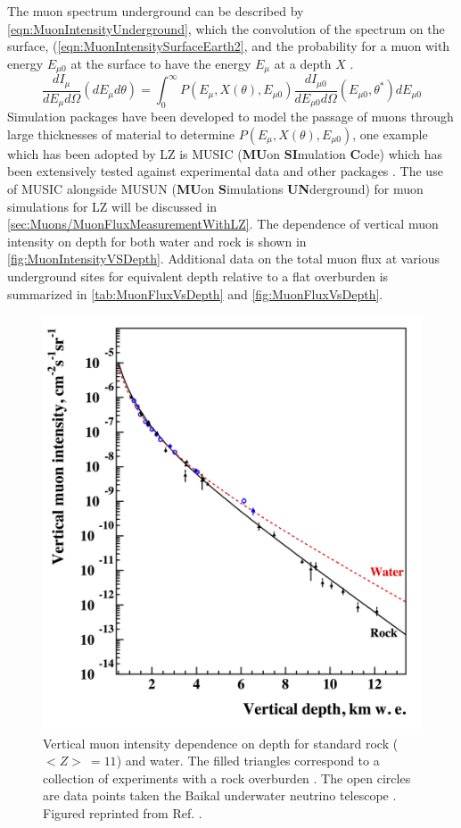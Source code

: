 The muon spectrum underground can be described by \autoref{eqn:MuonIntensityUnderground}, which the convolution of the spectrum on the surface, (\autoref{eqn:MuonIntensitySurfaceEarth2}, and the probability for a muon with energy $E_{\mu 0}$ at the surface to have the energy $E_\mu$ at a depth $X$ \cite{musun}.
\begin{equation}\label{eqn:MuonIntensityUnderground}
    \frac{dI_\mu}{dE_\mu d\Omega}(dE_\mu d\theta)=\int^\infty_0P(E_\mu,X(\theta),E_{\mu0})\frac{dI_{\mu0}}{dE_{\mu0}d\Omega}(E_{\mu0},\theta^*)dE_{\mu 0}
\end{equation}
Simulation packages have been developed to model the passage of muons through large thicknesses of material to determine $P(E_\mu,X(\theta),E_{\mu0})$, one example which has been adopted by LZ is MUSIC (\textbf{MU}on \textbf{SI}mulation \textbf{C}ode) which has been extensively tested against experimental data and other packages \cite{musun,LVD:1998lir,PhysRevD.60.112001,Tang:2006uu,MACRO:2003qix}. The use of MUSIC alongside MUSUN (\textbf{MU}on \textbf{S}imulations \textbf{UN}derground) for muon simulations for LZ will be discussed in \autoref{sec:Muons/MuonFluxMeasurementWithLZ}.
The dependence of vertical muon intensity on depth for both water and rock is shown in \autoref{fig:MuonIntensityVSDepth}. Additional data on the total muon flux at various underground sites for equivalent depth relative to a flat overburden is summarized in \autoref{tab:MuonFluxVsDepth} and \autoref{fig:MuonFluxVsDepth}.
\begin{figure}[ht!]
    \centering
    \includegraphics[width=0.7\linewidth]{figures/Muons/MuonIntensityVSVertDepth.png}
    \caption{Vertical muon intensity dependence on depth for standard rock ($<Z>\:=11$) and water. The filled triangles correspond to a collection of experiments with a rock overburden \cite{Kozyarivsky:1988gxn}. The open circles are data points taken the Baikal underwater neutrino telescope \cite{BAIKAL:1997iok}. Figured reprinted from Ref. \cite{dwoodward:thesis}.}
    \label{fig:MuonIntensityVSDepth}
\end{figure}
